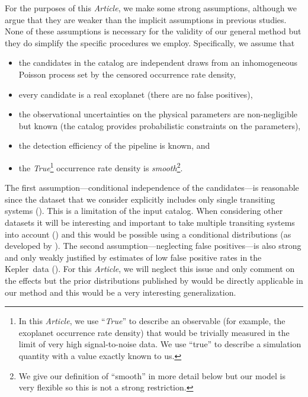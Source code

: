 \documentclass[12pt,preprint]{aastex}
\newcommand{\project}[1]{{\sffamily #1}}
\newcommand{\kepler}{\project{Kepler}}
\newcommand{\paper}{\textsl{Article}}
\newcommand{\foreign}[1]{\emph{#1}}
\newcommand{\True}{\foreign{True}}
\begin{document}
For the purposes of this \paper, we make some strong assumptions, although we
argue that they are weaker than the implicit assumptions in previous
studies.
None of these assumptions is necessary for the validity of our general method
but they do simplify the specific procedures we employ.
Specifically, we assume that
\begin{itemize}

\item the candidates in the catalog are independent draws from an
inhomogeneous Poisson process set by the censored occurrence rate density,

\item every candidate is a real exoplanet (there are no false positives),

\item the observational uncertainties on the physical parameters are
non-negligible but known (the catalog provides probabilistic constraints on
the parameters),

\item the detection efficiency of the pipeline is known, and

\item the \True\footnote{In this \paper, we use ``\True'' to describe an
observable (for example, the exoplanet occurrence rate density) that would be
trivially measured in the limit of very high signal-to-noise data.
We use ``true'' to describe a simulation quantity with a value exactly known
to us.} occurrence rate density is \emph{smooth}\footnote{We give our
definition of ``smooth'' in more detail below but our model is very flexible
so this is not a strong restriction.}.

\end{itemize}
The first assumption---conditional independence of the candidates---is
reasonable since the dataset that we consider explicitly includes only single
transiting systems (\citealt{petigura}).
This is a limitation of the input catalog.
When considering other datasets it will be interesting and important to take
multiple transiting systems into account (\citealt{lissauer, tremaine, fang})
and this would be possible using a conditional distributions (as developed by
\citealt{tremaine}).
The second assumption---neglecting false positives---is also strong and only
weakly justified by estimates of low false positive rates in the \kepler\ data
(\citealt{fressin-fp, morton}).
For this \paper, we will neglect this issue and only comment on the effects
but the prior distributions published by \citet{fressin-fp} would be directly
applicable in our method and this would be a very interesting generalization.
\end{document}
